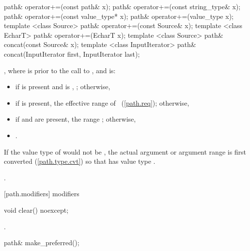 \begin{itemdecl}
path& operator+=(const path& x);
path& operator+=(const string_type& x);
path& operator+=(const value_type* x);
path& operator+=(value_type x);
template <class Source>
  path& operator+=(const Source& x);
template <class EcharT>
  path& operator+=(EcharT x);
template <class Source>
  path& concat(const Source& x);
template <class InputIterator>
  path& concat(InputIterator first, InputIterator last);
\end{itemdecl}

\begin{itemdescr}
\pnum
\postcondition {},
 where  is  prior to the call to ,
 and  is:
 \begin{itemize}
\item if  is present and is ,
 ; otherwise,
\item if  is present,
 the effective range of ~(\ref{path.req}); otherwise,
\item if  and  are present,
 the range ; otherwise,
\item {}.
\end{itemize}
If the value type of  would not be ,
  the actual argument or argument range is first converted (\ref{path.type.cvt}) so that  has value type .

\pnum
\returns {}.
\end{itemdescr}

[path.modifiers]{ modifiers}

\begin{itemdecl}
void clear() noexcept;
\end{itemdecl}

\begin{itemdescr}
\pnum
\postcondition {}.
\end{itemdescr}

\begin{itemdecl}
path& make_preferred();
\end{itemdecl}

